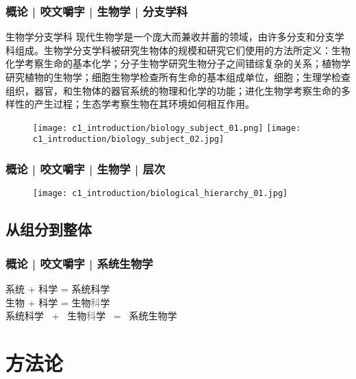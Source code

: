\begin{frame}
  \frametitle{概论 | 咬文嚼字 | 生物学 | 分支学科}
  \begin{block}{生物学分支学科}
现代生物学是一个庞大而兼收并蓄的领域，由许多分支和分支学科组成。生物学分支学科被研究生物体的规模和研究它们使用的方法所定义：生物化学考察生命的基本化学；分子生物学研究生物分子之间错综复杂的关系；植物学研究植物的生物学；细胞生物学检查所有生命的基本组成单位，细胞；生理学检查组织，器官，和生物体的器官系统的物理和化学的功能；进化生物学考察生命的多样性的产生过程；生态学考察生物在其环境如何相互作用。
  \end{block}
  \begin{figure}
    \centering
    \texttt{[image: c1\_introduction/biology\_subject\_01.png]}\qquad
    \texttt{[image: c1\_introduction/biology\_subject\_02.jpg]}
  \end{figure}
\end{frame}

\begin{frame}
  \frametitle{概论 | 咬文嚼字 | 生物学 | 层次}
  \begin{figure}
    \centering
    \texttt{[image: c1\_introduction/biological\_hierarchy\_01.jpg]}
  \end{figure}
\end{frame}

\subsection{从组分到整体}
\begin{frame}
  \frametitle{概论 | 咬文嚼字 | 系统生物学}
  \begin{huge}
  \begin{center}
    \pause
    系统 \quad + \quad 科学 \quad = \quad 系统科学\\  
    \vspace{1em}
    \pause
    生物 \quad + \quad 科学 \quad = \quad 生物\textcolor{gray}{科}学\\ 
    \vspace{1em}
    \pause
    系统科学 \ + \ 生物\textcolor{gray}{科}学 \ = \ 系统生物学
  \end{center}
  \end{huge}
\end{frame}

\section{方法论}
